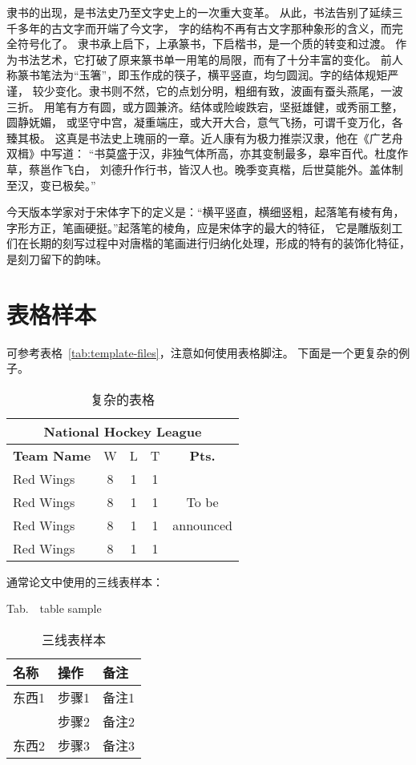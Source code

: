 {\li 隶书的出现，是书法史乃至文字史上的一次重大变革。
从此，书法告别了延续三千多年的古文字而开端了今文字，
字的结构不再有古文字那种象形的含义，而完全符号化了。
隶书承上启下，上承篆书，下启楷书，是一个质的转变和过渡。
作为书法艺术，它打破了原来篆书单一用笔的局限，而有了十分丰富的变化。
前人称篆书笔法为“玉箸”，即玉作成的筷子，横平竖直，均匀圆润。字的结体规矩严谨，
较少变化。隶书则不然，它的点划分明，粗细有致，波画有蚕头燕尾，一波三折。
用笔有方有圆，或方圆兼济。结体或险峻跌宕，坚挺雄健，或秀丽工整，圆静妩媚，
或坚守中宫，凝重端庄，或大开大合，意气飞扬，可谓千变万化，各臻其极。
这真是书法史上瑰丽的一章。近人康有为极力推崇汉隶，他在《广艺舟双楫》中写道：
“书莫盛于汉，非独气体所高，亦其变制最多，皋牢百代。杜度作草，蔡邕作飞白，
刘德升作行书，皆汉人也。晚季变真楷，后世莫能外。盖体制至汉，变已极矣。”
}

{\song
今天版本学家对于宋体字下的定义是：“横平竖直，横细竖粗，起落笔有棱有角，
字形方正，笔画硬挺。”起落笔的棱角，应是宋体字的最大的特征，
它是雕版刻工们在长期的刻写过程中对唐楷的笔画进行归纳化处理，形成的特有的装饰化特征，
是刻刀留下的韵味。}

\section{表格样本}

可参考表格~\ref{tab:template-files}，注意如何使用表格脚注。
下面是一个更复杂的例子。
\begin{table}[htb]
\centering \caption{复杂的表格}\label{tab:tab1}
\begin{tabular}{|l||ccc||c|}\hline
\multicolumn{5}{|c|}{National Hockey League}\\ \hline \hline
\textbf{Team Name} & W & L & T & \textbf{Pts.} \\ \hline Red Wings &
8 & 1 & 1 & \\ \cline{1-4} Red Wings & 8 & 1 & 1 & To be\\
\cline{1-4} Red Wings & 8 & 1 & 1 & announced\\ \cline{1-4} Red
Wings & 8 & 1 & 1 & \\\hline
\end{tabular}
\end{table}

通常论文中使用的三线表样本：

\begin{table}[ht]
\centering
\caption{\label{tab:table_name}三线表样本}
{\dawu Tab.\thetable~~table sample\vspace{11pt}\\}
\begin{tabular}{lll}
  \toprule[1.5pt]
  名称		& 操作				& 备注			\\\midrule[1pt]
  东西1		& 步骤1				& 备注1			\\
  			& 步骤2				& 备注2			\\
  东西2		& 步骤3				& 备注3			\\
  \bottomrule[1.5pt]
\end{tabular}
\end{table}

